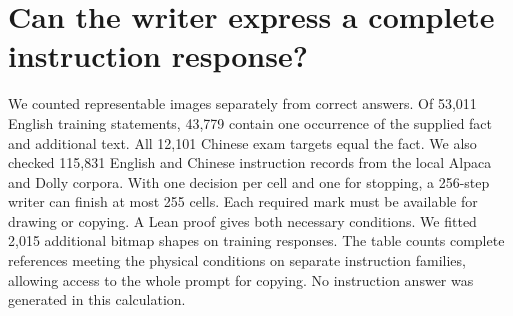 \section*{Can the writer express a complete instruction response?}
We counted representable images separately from correct answers. Of 53,011 English training statements, 43,779 contain one occurrence of the supplied fact and additional text. All 12,101 Chinese exam targets equal the fact. We also checked 115,831 English and Chinese instruction records from the local Alpaca and Dolly corpora. With one decision per cell and one for stopping, a 256-step writer can finish at most 255 cells. Each required mark must be available for drawing or copying. A Lean proof gives both necessary conditions. We fitted 2,015 additional bitmap shapes on training responses. The table counts complete references meeting the physical conditions on separate instruction families, allowing access to the whole prompt for copying. No instruction answer was generated in this calculation.

\smallskip{}
\newpage

